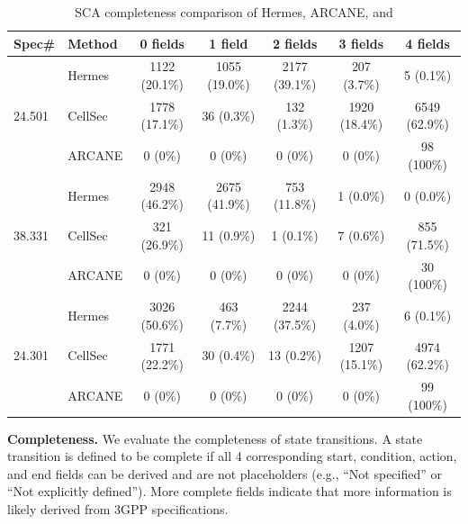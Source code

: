 \begin{table}[t]
\centering
\caption{
SCA completeness comparison of Hermes, ARCANE, and \lm
}
\vspace{-0.1in}
\label{tab:sca_completeness}
\scriptsize
\setlength{\tabcolsep}{2.2pt}
\begin{tabular}{p{0.5cm}lccccc}
\toprule
\textbf{Spec\#} & \textbf{Method} & \textbf{0 fields} & \textbf{1 field} & \textbf{2 fields} & \textbf{3 fields} & \textbf{4 fields} \\
\midrule

\multirow{3}{*}{24.501}
 & Hermes  & 1122 (20.1\%) & 1055 (19.0\%) & 2177 (39.1\%) & 207 (3.7\%) & 5 (0.1\%)   \\
 & CellSec & 1778 (17.1\%) & 36 (0.3\%)    & 132 (1.3\%)  & 1920 (18.4\%) & 6549 (62.9\%) \\
 & ARCANE  & 0 (0\%) & 0 (0\%) & 0 (0\%) & 0 (0\%) & 98 (100\%) \\

\midrule

\multirow{3}{*}{38.331}
 & Hermes  & 2948 (46.2\%) & 2675 (41.9\%) & 753 (11.8\%) & 1 (0.0\%) & 0 (0.0\%)   \\
 & CellSec & 321 (26.9\%)  & 11 (0.9\%)    & 1 (0.1\%)   & 7 (0.6\%) & 855 (71.5\%) \\
 & ARCANE  & 0 (0\%) & 0 (0\%) & 0 (0\%) & 0 (0\%) & 30 (100\%) \\

\midrule

\multirow{3}{*}{24.301}
 & Hermes  & 3026  (50.6\%) & 463 (7.7\%)   & 2244 (37.5\%) & 237 (4.0\%) & 6 (0.1\%)   \\
 & CellSec & 1771 (22.2\%) & 30 (0.4\%)    & 13 (0.2\%)   & 1207 (15.1\%) & 4974 (62.2\%) \\
 & ARCANE  & 0 (0\%) & 0 (0\%) & 0 (0\%) & 0 (0\%) & 99 (100\%) \\

\bottomrule
\end{tabular}
\vspace{-0.15in}
\end{table}



\noindent \textbf{Completeness.} We evaluate the completeness of state transitions. A state transition is defined to be complete if all 4 corresponding start, condition, action, and end fields can be derived and are not placeholders (e.g., ``Not specified'' or ``Not explicitly defined''). More complete fields indicate that more information is likely derived from 3GPP specifications. 

